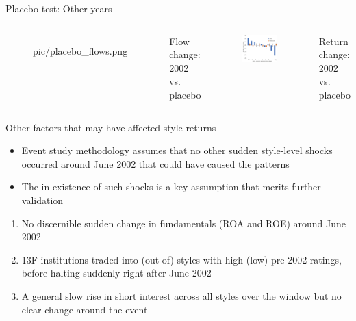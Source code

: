 \documentclass[UTF8, 16pt]{beamer}
\begin{document}
\begin{CJK*}{UTF8}{gbsn}
\begin{frame}{Placebo test: Other years}
\begin{columns}
\begin{figure}[htpb]
\begin{center}
		    {pic/placebo_flows.png}
		  \end{center}
		\end{figure}
		\vspace{-0.6cm}
		\center\tiny{Flow change: 2002 vs. placebo}
		\begin{figure}[htpb]
		  \begin{center}
		    \includegraphics[width=1.1  \linewidth]
		    {pic/placebo_returns.png}
		  \end{center}
		\end{figure}
		\vspace{-0.6cm}
		\center\tiny{Return change: 2002 vs. placebo}
	\end{columns}
\end{frame}

\begin{frame}{Other factors that may have affected style returns}
	\begin{itemize}
		\item Event study methodology assumes that no other sudden style-level shocks occurred around June 2002 that could have caused the patterns
		\item The in-existence of such shocks is a key assumption that merits further validation
	\end{itemize}
	\begin{enumerate}
		\item No discernible sudden change in fundamentals (ROA and ROE) around June 2002 
		\item 13F institutions traded into (out of) styles with high (low) pre-2002 ratings, before halting suddenly right after June 2002
		\item A general slow rise in short interest across all styles over the window but no clear change around the event
	\end{enumerate}
\end{frame}


\end{CJK*}
\end{document}
